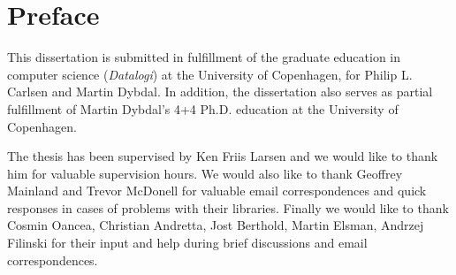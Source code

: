 {}
\chapter*{Preface}
This dissertation is submitted in fulfillment of the graduate education
in computer science (\textit{Datalogi}) at the University of
Copenhagen, for Philip L. Carlsen and Martin Dybdal. In addition, the
dissertation also serves as partial fulfillment of Martin Dybdal's 4+4
Ph.D. education at the University of Copenhagen.

The thesis has been supervised by Ken Friis Larsen and we would like
to thank him for valuable supervision hours. We would
also like to thank Geoffrey Mainland and Trevor McDonell for valuable
email correspondences and quick responses in cases of problems with
their libraries. Finally we would like to thank Cosmin Oancea,
Christian Andretta, Jost Berthold, Martin Elsman, Andrzej Filinski for
their input and help during brief discussions and email
correspondences.

